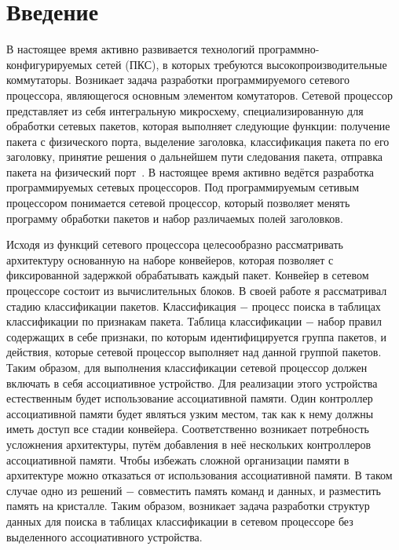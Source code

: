 \documentclass[a4peper, 12pt, titlepage, finall]{report}
\begin{document}
    \chapter*{Введение}
         В настоящее время активно развивается технологий программно-конфигурируемых сетей (ПКС), в которых требуются высокопроизводительные 
        коммутаторы. Возникает задача разработки программируемого сетевого процессора, являющегося основным элементом комутаторов. Сетевой процессор 
        представляет из себя интегральную микросхему, специализированную для обработки сетевых пакетов, которая выполняет следующие функции:
        получение пакета с физического порта, выделение заголовка,
        классификация пакета по его заголовку, принятие решения о дальнейшем пути следования пакета, отправка пакета на физический порт~\cite{chao2007high:1}.
        В настоящее время активно ведётся разработка программируемых сетевых процессоров. Под программируемым сетивым процессором
        понимается сетевой процессор, который позволяет менять программу обработки пакетов и набор различаемых полей заголовков.
        
        Исходя из функций сетевого процессора целесообразно рассматривать архитектуру основанную на
        наборе конвейеров, которая позволяет с фиксированной задержкой обрабатывать каждый пакет. 
        Конвейер в сетевом процессоре состоит из вычислительных блоков. В своей работе я рассматривал стадию классификации пакетов. Классификация $-$ процесс поиска в таблицах классификации
        по признакам пакета. Таблица классификации $-$ набор правил содержащих в себе признаки, по которым идентифицируется группа пакетов,
        и действия, которые сетевой процессор выполняет над данной группой пакетов. 
        Таким образом, для выполнения классификации сетевой процессор должен включать в себя ассоциативное устройство. Для реализации этого устройства естественным будет использование 
        ассоциативной памяти. Один контроллер ассоциативной памяти будет являться узким местом, так как к нему должны иметь доступ все стадии конвейера.
        Соответственно возникает потребность усложнения архитектуры, путём добавления в неё нескольких контроллеров ассоциативной памяти.
        Чтобы избежать сложной организации памяти в архитектуре можно отказаться от использования ассоциативной памяти. 
        В таком случае одно из решений $-$ совместить память команд и данных, и разместить память на кристалле.
        Таким образом, возникает задача разработки структур данных для поиска в таблицах классификации в сетевом процессоре без выделенного ассоциативного устройства.
 
\end{document}
